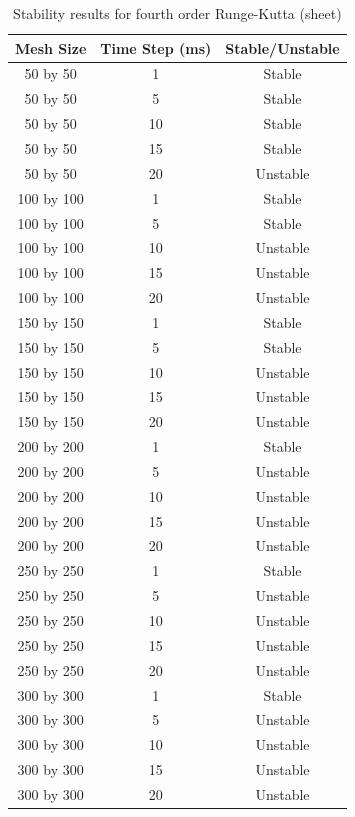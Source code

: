 \begin{table}[tp]
   \begin{minipage}{\textwidth}
      \begin{center}
         \begin{tabular}{|c|c|c|} \hline
           Mesh Size & Time Step (ms) & Stable/Unstable\\
           \hline
           50 by 50 & 1 & Stable\\ \hline
           50 by 50 & 5 & Stable\\ \hline
           50 by 50 & 10 & Stable\\ \hline
           50 by 50 & 15 & Stable\\ \hline
           50 by 50 & 20 & Unstable\\ \hline
           100 by 100 & 1 & Stable\\ \hline
           100 by 100 & 5 & Stable\\ \hline
           100 by 100 & 10 & Unstable\\ \hline
           100 by 100 & 15 & Unstable\\ \hline
           100 by 100 & 20 & Unstable\\ \hline           
           150 by 150 & 1 & Stable\\ \hline
           150 by 150 & 5 & Stable\\ \hline
           150 by 150 & 10 & Unstable\\ \hline
           150 by 150 & 15 & Unstable\\ \hline
           150 by 150 & 20 & Unstable\\ \hline           
           200 by 200 & 1 & Stable\\ \hline
           200 by 200 & 5 & Unstable\\ \hline
           200 by 200 & 10 & Unstable\\ \hline
           200 by 200 & 15 & Unstable\\ \hline
           200 by 200 & 20 & Unstable\\ \hline           
           250 by 250 & 1 & Stable\\ \hline
           250 by 250 & 5 & Unstable\\ \hline
           250 by 250 & 10 & Unstable\\ \hline
           250 by 250 & 15 & Unstable\\ \hline
           250 by 250 & 20 & Unstable\\ \hline           
           300 by 300 & 1 & Stable\\ \hline
           300 by 300 & 5 & Unstable\\ \hline
           300 by 300 & 10 & Unstable\\ \hline
           300 by 300 & 15 & Unstable\\ \hline
           300 by 300 & 20 & Unstable\\ \hline
         \end{tabular}
      \end{center}
   \end{minipage}
   \caption{Stability results for fourth order Runge-Kutta (sheet)}
   \label{tab:rk4 stability sheet}
\end{table}

